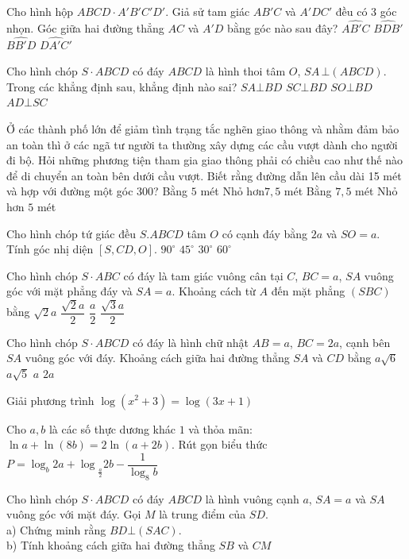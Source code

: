 \begin{ex}
Cho hình hộp $ABCD \cdot A'B'C'D'$. Giả sử tam giác $AB'C$ và $A'DC'$ đều có 3 góc nhọn. Góc giữa hai đường thẳng $AC$ và $A'D$ bằng góc nào sau đây?
\choice
{$\widehat{AB'C}$}
{$\widehat{BDB'}$}
{$\widehat{BB'D}$}
{$\widehat{DA'C'}$}
\end{ex}
\begin{ex}
Cho hình chóp $S \cdot ABCD$ có đáy $ABCD$ là hình thoi tâm $O$, $SA\,\bot (ABCD)$. Trong các khẳng định sau, khẳng định nào sai?
\choice
{$SA\bot BD$}
{$SC\bot BD$}
{$SO\bot BD$}
{$AD\bot SC$}
\end{ex}
\begin{ex}
Ở các thành phố lớn để giảm tình trạng tắc nghẽn giao thông và nhằm đảm bảo an toàn thì ở các ngã tư người ta thường xây dựng các cầu vượt dành cho người đi bộ. Hỏi những phương tiện tham gia giao thông phải có chiều cao như thế nào để di chuyển an toàn bên dưới cầu vượt. Biết rằng đường dẫn lên cầu dài 15 mét và hợp với đường một góc 300?
\choice
{Bằng $5$ mét}
{Nhỏ hơn$7{,}5$ mét}
{Bằng $7{,}5$ mét}
{Nhỏ hơn $5$ mét}
\end{ex}
\begin{ex}
Cho hình chóp tứ giác đều $S.ABCD$ tâm $O$ có cạnh đáy bằng $2a$ và $SO=a$. Tính góc nhị diện $\left[S, CD, O\right]$.
\choice
{$90^\circ $}
{$45^\circ $}
{$30^\circ$}
{$60^\circ $}
\end{ex}
\begin{ex}
Cho hình chóp $S \cdot ABC$ có đáy là tam giác vuông cân tại $C$, $BC=a$, $SA$ vuông góc với mặt phẳng đáy và $SA=a$. Khoảng cách từ $A$ đến mặt phẳng $(SBC)$ bằng
\choice
{$\sqrt{2}a$}
{$\dfrac{\sqrt{2}a}{2}$}
{$\dfrac{a}{2}$}
{$\dfrac{\sqrt{3}a}{2}$}
\end{ex}
\begin{ex}
Cho hình chóp $S \cdot ABCD$ có đáy là hình chữ nhật $AB=a$, $BC=2a$, cạnh bên $SA$ vuông góc với đáy. Khoảng cách giữa hai đường thẳng $SA$ và $CD$ bằng
\choice
{$a\sqrt{6}$}
{$a\sqrt{5}$}
{$a$}
{$2a$}
\end{ex}
\begin{ex}
Giải phương trình $\log \left(x^2+3\right)=\log (3x+1)$
\end{ex}
\begin{ex}
Cho $a,b$ là các số thực dương khác $1$ và thỏa mãn: $\ln a+\ln (8b)=2\ln (a+2b)$.
Rút gọn biểu thức $P={{\log _b2a+\log }_{\tfrac{a}{2}}}2b-\dfrac{1}{\log _8b}$
\end{ex}
\begin{ex}
Cho hình chóp $S \cdot ABCD$ có đáy $ABCD$ là hình vuông cạnh $a$, $SA=a$ và $SA$ vuông góc với mặt đáy. Gọi $M$ là trung điểm của $SD$.\\ 
a) Chứng minh rằng $BD\bot (SAC)$.\\
b) Tính khoảng cách giữa hai đường thẳng $SB$ và $CM$\\
\end{ex}

